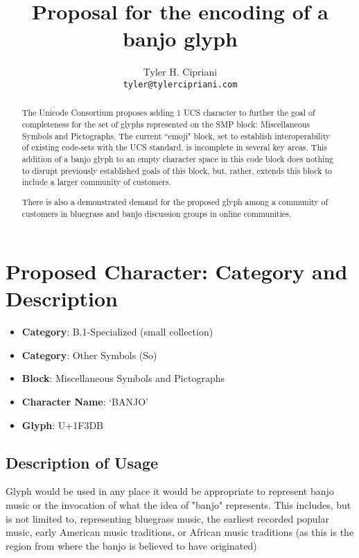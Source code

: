 \documentclass[12pt]{article}
\author{Tyler H. Cipriani\\
  \texttt{tyler@tylercipriani.com}}
\title{Proposal for the encoding of a banjo glyph}
\begin{document}
  \maketitle

  \renewcommand{\abstractname}{Proposal}

  \begin{abstract}
    The Unicode Consortium proposes adding 1 UCS character to further the goal of completeness
    for the set of glyphs represented on the SMP block: Miscellaneous Symbols and Pictographs\cite{scherer}.
    The current ``emoji" block, set to establish interoperability of existing code-sets
    with the UCS standard, is incomplete in several key areas. This addition of
    a banjo glyph to an empty character space in this code block does nothing to
    disrupt previously established goals of this block, but, rather, extends this
    block to include a larger community of customers.

    There is also a demonstrated demand for the proposed glyph among a community of
    customers in bluegrass and banjo discussion groups in online communities.
  \end{abstract}

  \section{Proposed Character: Category and Description}
    \begin{itemize}
      \item \textbf{Category}: B.1-Specialized (small collection)
      \item \textbf{Category}: Other Symbols (So)
      \item \textbf{Block}: Miscellaneous Symbols and Pictographs
      \item \textbf{Character Name}: `BANJO'
      \item \textbf{Glyph}:  U+1F3DB
    \end{itemize}

    \subsection{Description of Usage}
      Glyph would be used in any place it would be appropriate to represent 
      banjo music or the invocation of what the idea of "banjo" represents.
      This includes, but is not limited to, representing bluegrass music,
      the earliest recorded popular music, early American music traditions, or
      African music traditions (as this is the region from where the banjo is
      believed to have originated)\cite{allen}
\end{document}
